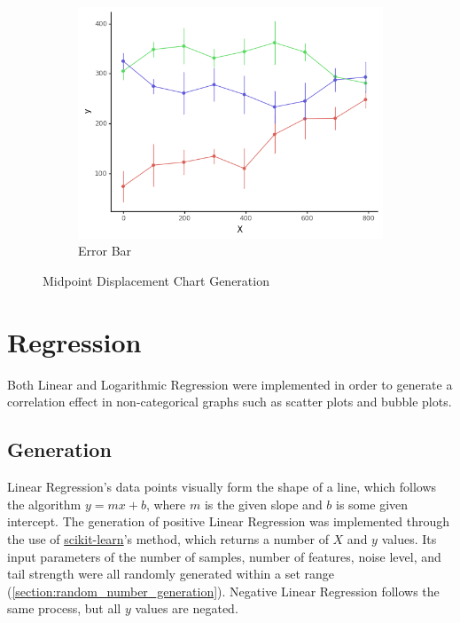 \begin{figure}
\begin{subfigure}[b]{0.32\textwidth}
        \centering
        \includegraphics[width=\textwidth]{figures/body/methodology/MD_errorbar.png}
        \caption{Error Bar}
        \label{figure:error_bar}
    \end{subfigure}
    \caption{Midpoint Displacement Chart Generation}
    \label{figure:midpoint_generation}
\end{figure}

\section{Regression}
Both Linear and Logarithmic Regression were implemented in order to generate a correlation effect in non-categorical graphs such as scatter plots and bubble plots.

\subsection{Generation}
Linear Regression's data points visually form the shape of a line, which follows the algorithm \(y = mx +b\), where \(m\) is the given slope and \(b\) is some given intercept. The generation of positive Linear Regression was implemented through the use of \href{https://scikit-learn.org/stable/}{scikit-learn}'s  method, which returns a number of \(X\) and \(y\) values. Its input parameters of the number of samples, number of features, noise level, and tail strength were all randomly generated within a set range (\autoref{section:random_number_generation}). Negative Linear Regression follows the same process, but all \(y\) values are negated.

